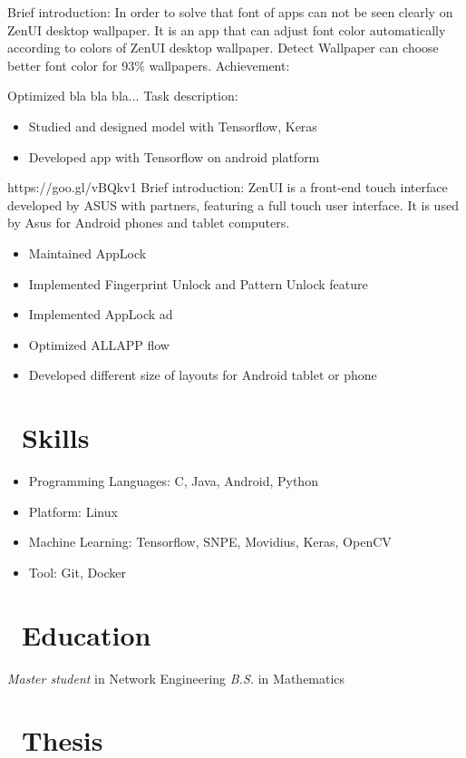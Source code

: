 \documentclass{resume}
\begin{document}
 {}
Brief introduction: In order to solve that font of apps can not be seen clearly on ZenUI desktop wallpaper. It is an app that can adjust font color automatically according to colors of ZenUI desktop wallpaper. Detect Wallpaper can choose better font color for 93\% wallpapers.
Achievement:
  \item Optimized bla bla bla...
Task description:
\begin{itemize}
  \item Studied and designed model with Tensorflow, Keras
  \item Developed app with Tensorflow on android platform 
\end{itemize}

 {https://goo.gl/vBQkv1}
Brief introduction: ZenUI is a front-end touch interface developed by ASUS with partners, featuring a full touch user interface. It is used by Asus for Android phones and tablet computers. 
\begin{itemize}
  \item Maintained AppLock
  \item Implemented Fingerprint Unlock and Pattern Unlock feature
  \item Implemented AppLock ad
  \item Optimized ALLAPP flow
  \item Developed different size of layouts for Android tablet or phone
\end{itemize}

\section{\faCogs\ Skills}
\begin{itemize}[parsep=0.5ex]
  \item Programming Languages: C, Java, Android, Python
  \item Platform: Linux
  \item Machine Learning: Tensorflow, SNPE, Movidius, Keras, OpenCV
  \item Tool: Git, Docker
\end{itemize}

\section{\faGraduationCap\ Education}
\textit{Master student} in Network Engineering
\textit{B.S.} in Mathematics

\section {\faTasks\ Thesis}
 {}
\end{document}

